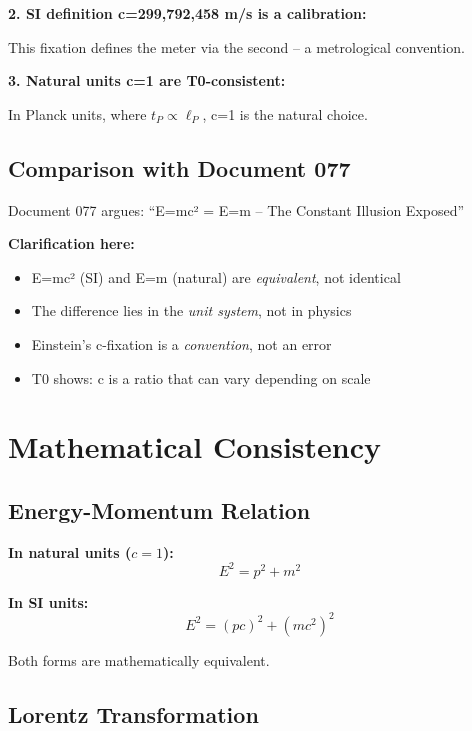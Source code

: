 	\textbf{2. SI definition c=299,792,458 m/s is a calibration:}
	
	This fixation defines the meter via the second -- a metrological convention.
	
	\textbf{3. Natural units c=1 are T0-consistent:}
	
	In Planck units, where $t_P \propto \ell_P$, c=1 is the natural choice.
	
	\subsection{Comparison with Document 077}
	
	Document 077 argues: ``E=mc² = E=m -- The Constant Illusion Exposed''
	
	\textbf{Clarification here:}
	\begin{itemize}
		\item E=mc² (SI) and E=m (natural) are \emph{equivalent}, not identical
		\item The difference lies in the \emph{unit system}, not in physics
		\item Einstein's c-fixation is a \emph{convention}, not an error
		\item T0 shows: c is a ratio that can vary depending on scale
	\end{itemize}
	
	\section{Mathematical Consistency}
	
	\subsection{Energy-Momentum Relation}
	
	\textbf{In natural units ($c=1$):}
	\begin{equation}
		E^2 = p^2 + m^2
	\end{equation}
	
	\textbf{In SI units:}
	\begin{equation}
		E^2 = (pc)^2 + (mc^2)^2
	\end{equation}
	
	Both forms are mathematically equivalent.
	
	\subsection{Lorentz Transformation}
	
